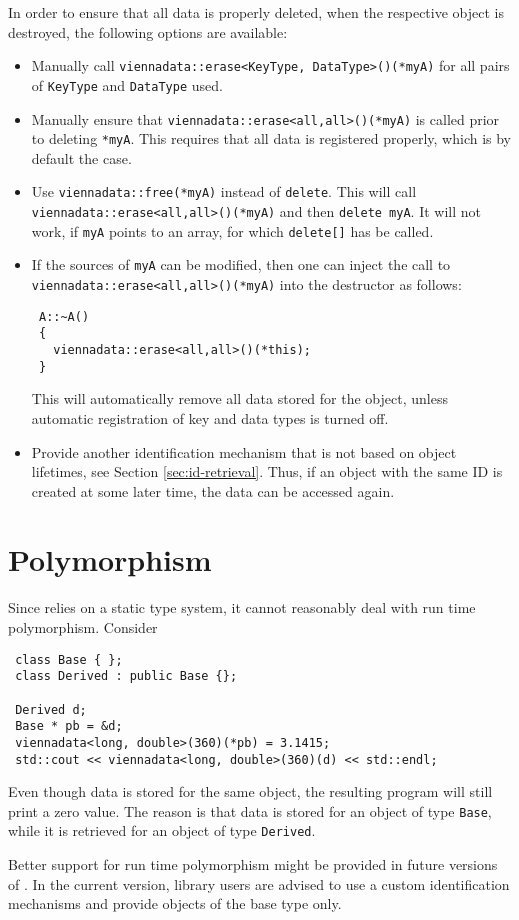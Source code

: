 In order to ensure that all data is properly deleted, when the respective object is destroyed, the following options are available:
\begin{itemize}
 \item Manually call \lstinline|viennadata::erase<KeyType, DataType>()(*myA)| for all pairs of \lstinline|KeyType| and \lstinline|DataType| used.
 \item Manually ensure that \lstinline|viennadata::erase<all,all>()(*myA)| is called prior to deleting \lstinline|*myA|. This requires that all data is registered properly, which is by default the case.
 \item Use \lstinline|viennadata::free(*myA)| instead of \lstinline|delete|. This will call \lstinline|viennadata::erase<all,all>()(*myA)| and then \lstinline|delete myA|. 
 It will not work, if \lstinline|myA| points to an array, for which \lstinline|delete[]| has be called.
 \item If the sources of \lstinline|myA| can be modified, then one can inject the call to \lstinline|viennadata::erase<all,all>()(*myA)| into the destructor as follows:
\begin{lstlisting}
 A::~A()
 {
   viennadata::erase<all,all>()(*this);
 }
\end{lstlisting}
This will automatically remove all data stored for the object, unless automatic registration of key and data types is turned off.
 \item Provide another identification mechanism that is not based on object lifetimes, see Section \ref{sec:id-retrieval}. Thus, if an object with the same ID is created at some later time, the data can be accessed again.
\end{itemize}


\section{Polymorphism}
Since {\ViennaData} relies on a static type system, it cannot reasonably deal with run time polymorphism. Consider
\begin{lstlisting}
 class Base { };
 class Derived : public Base {};

 Derived d;
 Base * pb = &d;
 viennadata<long, double>(360)(*pb) = 3.1415;
 std::cout << viennadata<long, double>(360)(d) << std::endl;
\end{lstlisting}
Even though data is stored for the same object, the resulting program will still print a zero value. 
The reason is that data is stored for an object of type \lstinline|Base|, while it is retrieved for an object of type \lstinline|Derived|.

Better support for run time polymorphism might be provided in future versions of {\ViennaData}. In the current version, library users are advised to use a custom identification mechanisms and provide objects of the base type only.


